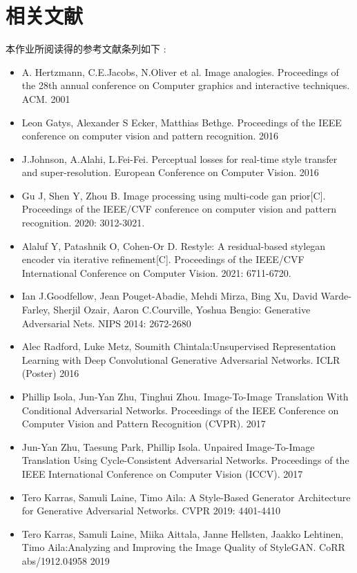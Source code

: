 \section{相关文献}

本作业所阅读得的参考文献条列如下 :

\begin{itemize}
\item A. Hertzmann, C.E.Jacobs, N.Oliver et al. Image analogies. Proceedings of the 28th annual conference on Computer graphics and interactive techniques. ACM. 2001
\item Leon Gatys, Alexander S Ecker, Matthias Bethge. Proceedings of the IEEE conference on computer vision and pattern recognition. 2016
\item J.Johnson, A.Alahi, L.Fei-Fei. Perceptual losses for real-time style transfer and super-resolution. European Conference on Computer Vision. 2016
\item Gu J, Shen Y, Zhou B. Image processing using multi-code gan prior[C]. Proceedings of the IEEE/CVF conference on computer vision and pattern recognition. 2020: 3012-3021.
\item Alaluf Y, Patashnik O, Cohen-Or D. Restyle: A residual-based stylegan encoder via iterative refinement[C]. Proceedings of the IEEE/CVF International Conference on Computer Vision. 2021: 6711-6720.
\item Ian J.Goodfellow, Jean Pouget-Abadie, Mehdi Mirza, Bing Xu, David Warde-Farley, Sherjil Ozair, Aaron C.Courville, Yoshua Bengio: Generative Adversarial Nets. NIPS 2014: 2672-2680 
\item Alec Radford, Luke Metz, Soumith Chintala:Unsupervised Representation Learning with Deep Convolutional Generative Adversarial Networks. ICLR (Poster) 2016
\item Phillip Isola, Jun-Yan Zhu, Tinghui Zhou. Image-To-Image Translation With Conditional Adversarial Networks. Proceedings of the IEEE Conference on Computer Vision and Pattern Recognition (CVPR). 2017
\item Jun-Yan Zhu, Taesung Park, Phillip Isola. Unpaired Image-To-Image Translation Using Cycle-Consistent Adversarial Networks. Proceedings of the IEEE International Conference on Computer Vision (ICCV). 2017
\item Tero Karras, Samuli Laine, Timo Aila: A Style-Based Generator Architecture for Generative Adversarial Networks. CVPR 2019: 4401-4410
\item Tero Karras, Samuli Laine, Miika Aittala, Janne Hellsten, Jaakko Lehtinen, Timo Aila:Analyzing and Improving the Image Quality of StyleGAN. CoRR abs/1912.04958 2019

\end{itemize}
